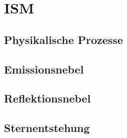 \chapter{ISM}
\section{Physikalische Prozesse}
\section{Emissionsnebel}
\section{Reflektionsnebel}
\section{Sternentstehung}
